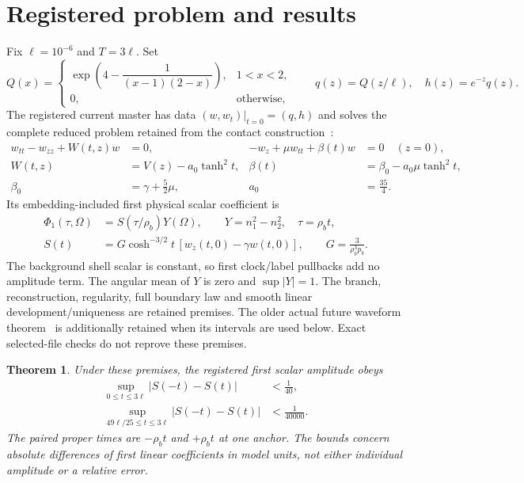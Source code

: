 \documentclass[11pt]{article}
\newtheorem{theorem}{Theorem}
\begin{document}
\section{Registered problem and results}
Fix $\ell=10^{-6}$ and $T=3\ell$. Set
\[
Q(x)=\begin{cases}
 \exp\!\left(4-\dfrac1{(x-1)(2-x)}\right),&1<x<2,\\
 0,&\text{otherwise},
\end{cases}
\qquad q(z)=Q(z/\ell),\quad h(z)=e^{-z}q(z).
\]
The registered current master has data $(w,w_t)|_{t=0}=(q,h)$ and solves
the complete reduced problem retained from the contact construction~\cite{contact}:
\begin{align}
 w_{tt}-w_{zz}+W(t,z)w&=0, &
 -w_z+\mu w_{tt}+\beta(t)w&=0\quad(z=0),\label{eq:wave}\\
 W(t,z)&=V(z)-a_0\tanh^2t, &
 \beta(t)&=\beta_0-a_0\mu\tanh^2t,\nonumber\\
 \beta_0&=\gamma+\tfrac52\mu, &a_0&=\tfrac{35}{4}.\nonumber
\end{align}
Its embedding-included first physical scalar coefficient is
\begin{equation}
\begin{aligned}
 \Phi_1(\tau,\Omega)&=S(\tau/\rho_b)Y(\Omega),\qquad
 Y=n_1^2-n_2^2,\quad \tau=\rho_bt,\\
 S(t)&=G\cosh^{-3/2}t\,[w_z(t,0)-\gamma w(t,0)],\qquad
 G=\frac3{\rho_b^3p_b}.
\end{aligned}
 \label{eq:physical}
\end{equation}
The background shell scalar is constant, so first clock/label pullbacks add
no amplitude term. The angular mean of $Y$ is zero and $\sup|Y|=1$.
The branch, reconstruction, regularity, full boundary law and smooth linear
development/uniqueness are retained premises. The older actual future
waveform theorem~\cite{inertial} is additionally retained when its intervals
are used below. Exact selected-file checks do not reprove these premises.

\begin{theorem}\label{thm:difference}
Under these premises, the registered first scalar amplitude obeys
\begin{align}
 \sup_{0\le t\le3\ell}|S(-t)-S(t)|&<\frac1{40},\label{eq:global}\\
 \sup_{49\ell/25\le t\le3\ell}|S(-t)-S(t)|&<\frac1{40000}.\label{eq:late}
\end{align}
The paired proper times are $-\rho_bt$ and $+\rho_bt$ at one anchor.
The bounds concern absolute differences of first linear coefficients in
model units, not either individual amplitude or a relative error.
\end{theorem}
\end{document}
